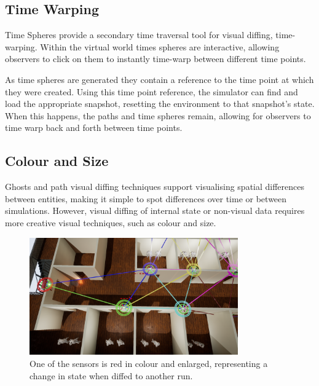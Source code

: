 \subsection{Time Warping} %
\label{sub:time_spheres}
Time Spheres provide a secondary time traversal tool for visual diffing, time-warping. Within the virtual world times spheres are interactive, allowing observers to click on them to instantly time-warp between different time points. 

As time spheres are generated they contain a reference to the time point at which they were created. Using this time point reference, the simulator can find and load the appropriate snapshot, resetting the environment to that snapshot's state. When this happens, the paths and time spheres remain, allowing for observers to time warp back and forth between time points.

\subsection{Colour and Size} %
\label{sub:colour_and_size}
Ghosts and path visual diffing techniques support visualising spatial differences between entities, making it simple to spot differences over time or between simulations. However, visual diffing of internal state or non-visual data requires more creative visual techniques, such as colour and size.


\begin{figure}[h]
	\centering
	\includegraphics[width=0.8\textwidth]{img/biggerSensorAlert.png}
	\caption{One of the sensors is red in colour and enlarged, representing a change in state when diffed to another run.}
	\label{fig:diff_colour size}
\end{figure}
